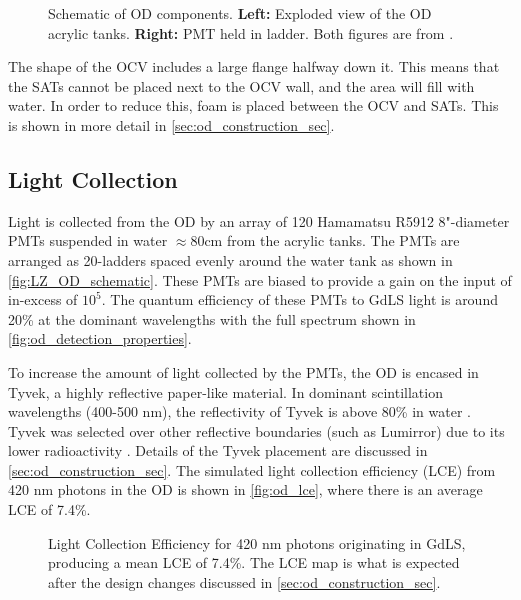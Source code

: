 \begin{figure}[]
\begin{subfigure}{.5\textwidth}
  \end{subfigure}
\caption{Schematic of OD components. \textbf{Left:} Exploded view of the OD acrylic tanks. \textbf{Right:} PMT held in ladder.
         Both figures are from \cite{LZ_TechnicalDesignReview_ref}.}
\label{fig:LZ_OD_schematic}
\end{figure}

\par
The shape of the OCV includes a large flange halfway down it. 
This means that the SATs cannot be placed next to the OCV wall, and the area will fill with water.
In order to reduce this, foam is placed between the OCV and SATs.
This is shown in more detail in \autoref{sec:od_construction_sec}.

\subsection{Light Collection}
\par
Light is collected from the OD by an array of 120 Hamamatsu R5912 8"-diameter PMTs suspended in water $\approx$80cm from the acrylic tanks.
The PMTs are arranged as 20-ladders spaced evenly around the water tank as shown in \autoref{fig:LZ_OD_schematic}.
These PMTs are biased to provide a gain on the input of in-excess of $10^{5}$.
The quantum efficiency of these PMTs to GdLS light is around 20\% at the dominant wavelengths with the full spectrum shown in \autoref{fig:od_detection_properties}.

\par
To increase the amount of light collected by the PMTs, the OD is encased in Tyvek, a highly reflective paper-like material.
In dominant scintillation wavelengths (400-500 nm), the reflectivity of Tyvek is above 80\% in water \cite{tyvek_thesis_ref,tyvek_reflectivity_ref}. 
Tyvek was selected over other reflective boundaries (such as Lumirror{\texttrademark}) due to its lower radioactivity \cite{LZ_assay_ref}.
Details of the Tyvek placement are discussed in \autoref{sec:od_construction_sec}.
The simulated light collection efficiency (LCE) from 420 nm photons in the OD is shown in \autoref{fig:od_lce}, where there is an average LCE of 7.4\%.

\begin{figure}
\centering
\resizebox{\textwidth}{!}{

}
\caption[Light Collection Efficiency for 420 nm photons originating in GdLS]{Light Collection Efficiency for 420 nm photons originating in GdLS, producing a mean LCE of 7.4\%.
The LCE map is what is expected after the design changes discussed in \autoref{sec:od_construction_sec}.}
\label{fig:od_lce}
\end{figure}


